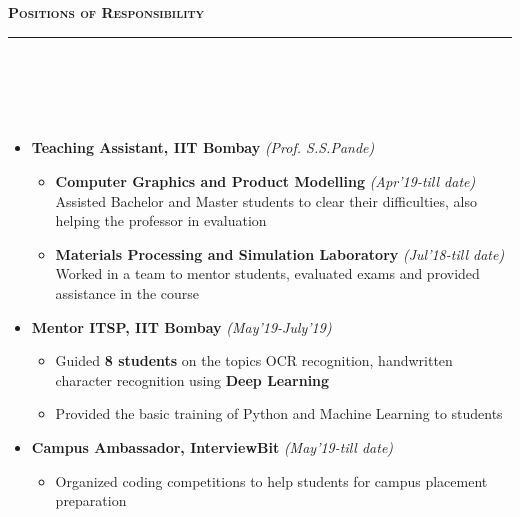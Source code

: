 \documentclass[a4paper,10pt]{article}
\newcommand{\isep}{-2 pt}
\newcommand{\lsep}{-0.5cm}
\newcommand{\resheading}[1]{{\small
        {
            \begin{minipage}
                {0.992\textwidth}\textbf{{\textsc{#1 \vphantom{p\^{E}} }}}
                \\[-0.3cm]
                \hrule
            \end{minipage}
            \\[-0.5cm]
        }
 }}
\begin{document}
\resheading{\textbf{\large Positions of Responsibility}}\\[\lsep] 
\\[-0.2cm]
\begin{itemize}\itemsep \isep
  \item \textbf{Teaching Assistant, IIT Bombay} \emph{(Prof. S.S.Pande)}\\[-0.6cm]
    	\begin{itemize}
            \item \textbf{Computer Graphics and Product Modelling} \hfill\emph{(Apr'19-till date)}
                \\
                 Assisted Bachelor and Master students to clear their difficulties, also helping the professor in evaluation
        	\item \textbf{Materials Processing and Simulation Laboratory} \hfill\emph{(Jul'18-till date)} 
        	\\
        Worked in a team to mentor students, evaluated exams and provided assistance in the course
    	\end{itemize}
  \item \textbf{Mentor ITSP, IIT Bombay} \hfill\emph{(May'19-July'19)}\\[-0.6cm]
    \begin{itemize}\itemsep \isep
         \item Guided \textbf{8 students} on the topics OCR recognition, handwritten character recognition using \textbf{Deep Learning}
            \item Provided the basic training of Python and Machine Learning to students
            \end{itemize}
     \item \textbf{Campus Ambassador, InterviewBit} \hfill\emph{(May'19-till date)}\\[-0.6cm]
    \begin{itemize}
          \item Organized coding competitions to help students for campus placement preparation
            \end{itemize}
            
\end{itemize}
\end{document}
